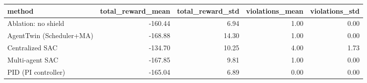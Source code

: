 \begin{tabular}{lrrrr}
\toprule
method & total_reward_mean & total_reward_std & violations_mean & violations_std \\
\midrule
Ablation: no shield & -160.44 & 6.94 & 1.00 & 0.00 \\
AgentTwin (Scheduler+MA) & -168.88 & 14.30 & 1.00 & 0.00 \\
Centralized SAC & -134.70 & 10.25 & 4.00 & 1.73 \\
Multi-agent SAC & -167.85 & 9.81 & 1.00 & 0.00 \\
PID (PI controller) & -165.04 & 6.89 & 0.00 & 0.00 \\
\bottomrule
\end{tabular}

